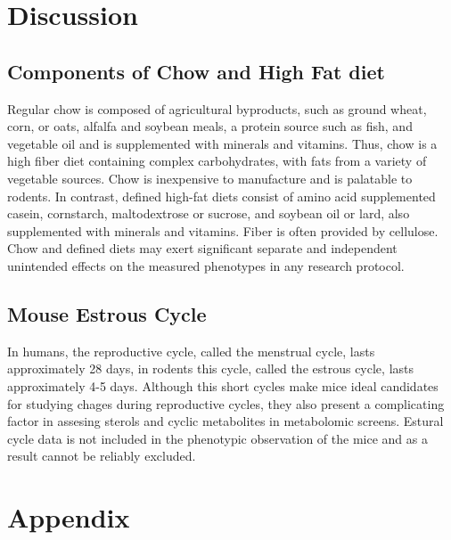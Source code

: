 \documentclass[a4paper]{article}
\begin{document}
\section{Discussion}
\subsection{Components of Chow and High Fat diet}
Regular chow is composed of agricultural byproducts, such as ground wheat, corn, or oats, alfalfa and soybean meals, a protein source such as fish, and vegetable oil and is supplemented with minerals and vitamins. Thus, chow is a high fiber diet containing complex carbohydrates, with fats from a variety of vegetable sources. Chow is inexpensive to manufacture and is palatable to rodents. In contrast, defined high-fat diets consist of amino acid supplemented casein, cornstarch, maltodextrose or sucrose, and soybean oil or lard, also supplemented with minerals and vitamins. Fiber is often provided by cellulose. Chow and defined diets may exert significant separate and independent unintended effects on the measured phenotypes in any research protocol.

\subsection{Mouse Estrous Cycle}

In humans, the reproductive cycle, called the menstrual cycle, lasts approximately 28 days, in rodents this cycle, called the estrous cycle, lasts approximately 4-5 days. Although this short cycles make mice ideal candidates for studying chages during reproductive cycles, they also present a complicating factor in assesing sterols and cyclic metabolites in metabolomic screens. Estural cycle data is not included in the phenotypic observation of the mice and as a result cannot be reliably excluded.

\section{Appendix}







\end{document}
